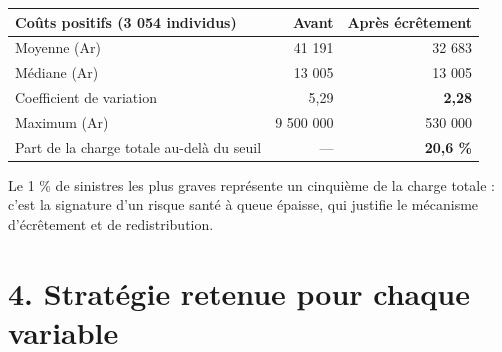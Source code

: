 \documentclass[

  french,

  10pt,

  a4paper,

]{article}
\newcounter{none} %
\begin{document}
{\def\LTcaptype{none} %

\begin{longtable}[]{@{}lrr@{}}

\toprule\noalign{}

Coûts positifs (3 054 individus) & Avant & Après écrêtement \\

\midrule\noalign{}

\endhead

\bottomrule\noalign{}

\endlastfoot

Moyenne (Ar) & 41 191 & 32 683 \\

Médiane (Ar) & 13 005 & 13 005 \\

Coefficient de variation & 5,29 & \textbf{2,28} \\

Maximum (Ar) & 9 500 000 & 530 000 \\

Part de la charge totale au-delà du seuil & --- & \textbf{20,6 \%} \\

\end{longtable}

}



Le 1 \% de sinistres les plus graves représente un cinquième de la charge totale : c'est la signature d'un risque santé à queue épaisse, qui justifie le mécanisme d'écrêtement et de redistribution.



\section{4. Stratégie retenue pour chaque variable}
\end{document}
